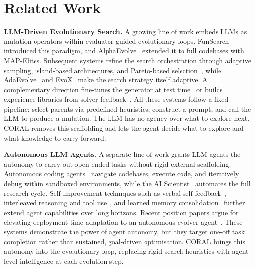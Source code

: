 
\section{Related Work}


\textbf{LLM-Driven Evolutionary Search.}
A growing line of work embeds LLMs as mutation operators within evaluator-guided evolutionary loops. FunSearch~\citep{romera2024funsearch} introduced this paradigm, and AlphaEvolve~\citep{novikov2025alphaevolve} extended it to full codebases with MAP-Elites. Subsequent systems refine the search orchestration through adaptive sampling, island-based architectures, and Pareto-based selection~\citep{sharma2025openevolve,lange2025shinkaevolve,khrulkov2025gigaevo,assumpcao2026codeevolve,yan2026pacevolve,agrawal2025gepa}, while AdaEvolve~\citep{cemri2026adaevolve} and EvoX~\citep{liu2026evox} make the search strategy itself adaptive. A complementary direction fine-tunes the generator at test time~\citep{wang2025thetaevolve,yuksekgonul2026tttdiscover} or builds experience libraries from solver feedback~\citep{ouyang2025reasoningbank,kong2025alphaopt}. All these systems follow a fixed pipeline: select parents via predefined heuristics, construct a prompt, and call the LLM to produce a mutation. The LLM has no agency over what to explore next. CORAL removes this scaffolding and lets the agent decide what to explore and what knowledge to carry forward.

 
\textbf{Autonomous LLM Agents.}
A separate line of work grants LLM agents the autonomy to carry out open-ended tasks without rigid external scaffolding. Autonomous coding agents~\citep{yang2024sweagent,wang2024openhands} navigate codebases, execute code, and iteratively debug within sandboxed environments, while the AI Scientist~\citep{lu2024aiscientist} automates the full research cycle. Self-improvement techniques such as verbal self-feedback~\citep{shinn2023reflexion,madaan2023selfrefine}, interleaved reasoning and tool use~\citep{yao2023react}, and learned memory consolidation~\citep{zhou2026mem,yu2026memagent} further extend agent capabilities over long horizons. Recent position papers argue for elevating deployment-time adaptation to an autonomous evolver agent~\citep{gao2026agentic}. These systems demonstrate the power of agent autonomy, but they target one-off task completion rather than sustained, goal-driven optimisation. CORAL brings this autonomy into the evolutionary loop, replacing rigid search heuristics with agent-level intelligence at each evolution step.
 
